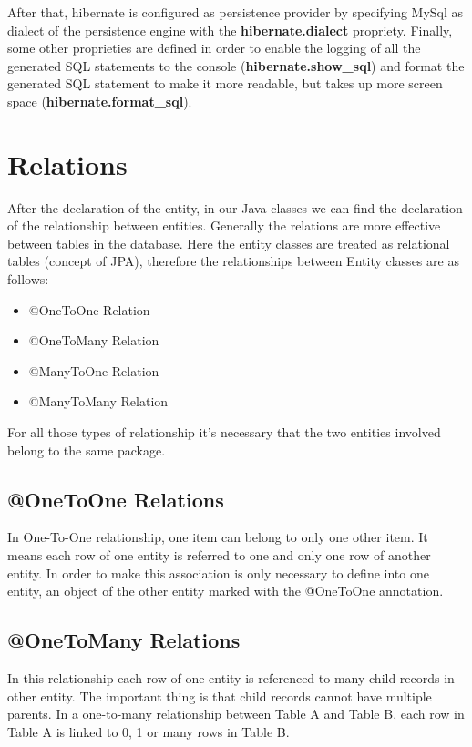 \documentclass[a4paper]{article}
\begin{document}
After that, hibernate is configured as persistence provider by specifying MySql as dialect of the persistence engine with the \textbf{hibernate.dialect} propriety. Finally, some other proprieties are defined in order to enable the logging of all the generated SQL statements to the console (\textbf{hibernate.show\_sql}) and format the generated SQL statement to make it more readable, but takes up more screen space (\textbf{hibernate.format\_sql}).

\section{Relations}
After the declaration of the entity, in our Java classes we can find the declaration of the relationship between entities. Generally the relations are more effective between tables in the database. Here the entity classes are treated as relational tables (concept of JPA), therefore the relationships between Entity classes are as follows:

\begin{itemize}
\item{@OneToOne Relation}
\item{@OneToMany Relation}
\item{@ManyToOne Relation}
\item{@ManyToMany Relation}
\end{itemize}
For all those types of relationship it's necessary that the two entities involved belong to the same package.

\subsection{@OneToOne Relations}
In One-To-One relationship, one item can belong to only one other item. It means each row of one entity is referred to one and only one row of another entity. In order to make this association is only necessary to define into one entity, an object of the other entity marked with the @OneToOne annotation.

\subsection{@OneToMany Relations}
In this relationship each row of one entity is referenced to many child records in other entity. The important thing is that child records cannot have multiple parents. In a one-to-many relationship between Table A and Table B, each row in Table A is linked to 0, 1 or many rows in Table B.
\end{document}
